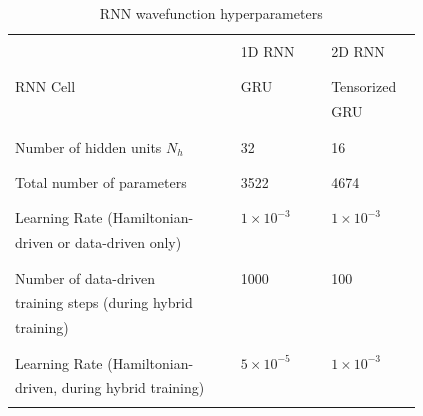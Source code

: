 \documentclass[twocolumn,
                showpacs,
                nofootinbib,
                nobibnotes,
                aps,
                superscriptaddress,
                amssymb,
                amsmath,
                floatfix,
                reprint,
                prx, 
                notitlepage,
                showkeys,
                10pt,
		]{revtex4-2}
\begin{document}
\begin{table}[]
    \centering
    \begin{tabular}{|m{0.5\linewidth}|m{0.2\linewidth}|m{0.2\linewidth}|}
    
        \hline
         & &\\
         & 1D RNN & 2D RNN\\
         & &\\
         \hline
         & &\\
        RNN Cell &  GRU & Tensorized  \\
         & & GRU \\
         & & \\
        \hline
         & & \\
        Number of hidden units $N_h$ & 32 & 16\\
          & &\\
        \hline
         & &\\
        Total number of parameters & 3522 & 4674 \\
          & & \\
        \hline
          & & \\
         Learning Rate (Hamiltonian-& $1\times10^{-3}$ & $1\times10^{-3}$\\
         driven or data-driven only) & &\\
           & & \\
        \hline
         & & \\
         Number of data-driven & 1000 & 100\\
        training steps (during hybrid & &\\
          training) & &\\
          & & \\
        \hline
          & & \\
         Learning Rate (Hamiltonian- & $5\times10^{-5}$ & $1\times10^{-3}$\\
         driven,  during hybrid training) & &\\
          & & \\
        \hline
    \end{tabular}
    \caption{RNN wavefunction hyperparameters}
    \label{tab:rnnparams}
\end{table}

{}
\end{document}
